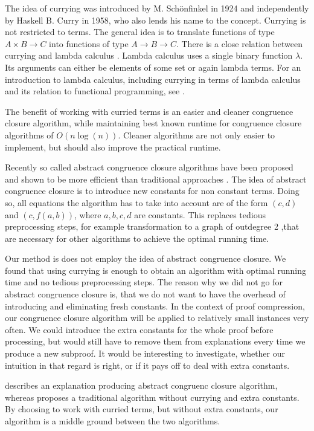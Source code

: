 The idea of currying was introduced by M. Sch\"onfinkel \cite{Schoenfinkel1924} in 1924 and independently by Haskell B. Curry \cite{Curry1958} in 1958, who also lends his name to the concept.
Currying is not restricted to terms.
The general idea is to translate functions of type $A \times B \rightarrow C$ into functions of type $A \rightarrow B \rightarrow C$.
There is a close relation between currying and lambda calculus \cite{Church1936}.
Lambda calculus uses a single binary function $\lambda$.
Its arguments can either be elements of some set or again lambda terms.
For an introduction to lambda calculus, including currying in terms of lambda calculus and its relation to functional programming, see \cite{Barendregt1997}.

The benefit of working with curried terms is an easier and cleaner congruence closure algorithm, while maintaining best known runtime for congruence closure algorithms of $O(n \log(n))$.
Cleaner algorithms are not only easier to implement, but should also improve the practical runtime.

Recently so called abstract congruence closure algorithms have been proposed and shown to be more efficient than traditional approaches \cite{Bachmair2000}.
The idea of abstract congruence closure is to introduce new constants for non constant terms.
Doing so, all equations the algorithm has to take into account are of the form $(c,d)$ and $(c, f(a,b))$, where $a,b,c,d$ are constants.
This replaces tedious preprocessing steps, for example transformation to a graph of outdegree 2 \cite{Downey1980},that are necessary for other algorithms to achieve the optimal running time.

Our method is does not employ the idea of abstract congruence closure.
We found that using currying is enough to obtain an algorithm with optimal running time and no tedious preprocessing steps.
The reason why we did not go for abstract congruence closure is, that we do not want to have the overhead of introducing and eliminating fresh constants.
In the context of proof compression, our congruence closure algorithm will be applied to relatively small instances very often.
We could introduce the extra constants for the whole proof before processing, but would still have to remove them from explanations every time we produce a new subproof.
It would be interesting to investigate, whether our intuition in that regard is right, or if it pays off to deal with extra constants.

\cite{Nieuwenhuis2005,Nieuwenhuis2007} describes an explanation producing abstract congruenc closure algorithm, 
whereas \cite{Fontaine2004} proposes a traditional algorithm without currying and extra constants.
By choosing to work with curried terms, but without extra constants, our algorithm is a middle ground between the two algorithms.

